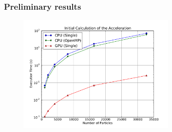 
\begin{frame}
    \frametitle{Preliminary results}
    \begin{figure}
        \centering
        \label{fig:init}
        \includegraphics[width=0.7\textwidth]{img/init}
    \end{figure}
\end{frame}


